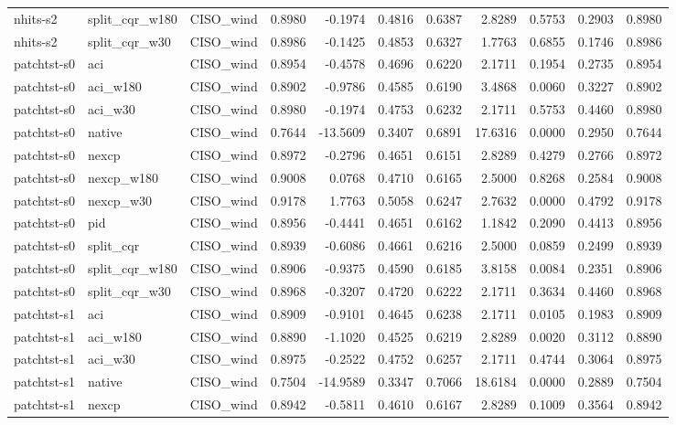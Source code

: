 \begin{tabular}{lllrrrrrrrr}
nhits-s2 & split_cqr_w180 & CISO_wind & 0.8980 & -0.1974 & 0.4816 & 0.6387 & 2.8289 & 0.5753 & 0.2903 & 0.8980 \\
nhits-s2 & split_cqr_w30 & CISO_wind & 0.8986 & -0.1425 & 0.4853 & 0.6327 & 1.7763 & 0.6855 & 0.1746 & 0.8986 \\
patchtst-s0 & aci & CISO_wind & 0.8954 & -0.4578 & 0.4696 & 0.6220 & 2.1711 & 0.1954 & 0.2735 & 0.8954 \\
patchtst-s0 & aci_w180 & CISO_wind & 0.8902 & -0.9786 & 0.4585 & 0.6190 & 3.4868 & 0.0060 & 0.3227 & 0.8902 \\
patchtst-s0 & aci_w30 & CISO_wind & 0.8980 & -0.1974 & 0.4753 & 0.6232 & 2.1711 & 0.5753 & 0.4460 & 0.8980 \\
patchtst-s0 & native & CISO_wind & 0.7644 & -13.5609 & 0.3407 & 0.6891 & 17.6316 & 0.0000 & 0.2950 & 0.7644 \\
patchtst-s0 & nexcp & CISO_wind & 0.8972 & -0.2796 & 0.4651 & 0.6151 & 2.8289 & 0.4279 & 0.2766 & 0.8972 \\
patchtst-s0 & nexcp_w180 & CISO_wind & 0.9008 & 0.0768 & 0.4710 & 0.6165 & 2.5000 & 0.8268 & 0.2584 & 0.9008 \\
patchtst-s0 & nexcp_w30 & CISO_wind & 0.9178 & 1.7763 & 0.5058 & 0.6247 & 2.7632 & 0.0000 & 0.4792 & 0.9178 \\
patchtst-s0 & pid & CISO_wind & 0.8956 & -0.4441 & 0.4651 & 0.6162 & 1.1842 & 0.2090 & 0.4413 & 0.8956 \\
patchtst-s0 & split_cqr & CISO_wind & 0.8939 & -0.6086 & 0.4661 & 0.6216 & 2.5000 & 0.0859 & 0.2499 & 0.8939 \\
patchtst-s0 & split_cqr_w180 & CISO_wind & 0.8906 & -0.9375 & 0.4590 & 0.6185 & 3.8158 & 0.0084 & 0.2351 & 0.8906 \\
patchtst-s0 & split_cqr_w30 & CISO_wind & 0.8968 & -0.3207 & 0.4720 & 0.6222 & 2.1711 & 0.3634 & 0.4460 & 0.8968 \\
patchtst-s1 & aci & CISO_wind & 0.8909 & -0.9101 & 0.4645 & 0.6238 & 2.1711 & 0.0105 & 0.1983 & 0.8909 \\
patchtst-s1 & aci_w180 & CISO_wind & 0.8890 & -1.1020 & 0.4525 & 0.6219 & 2.8289 & 0.0020 & 0.3112 & 0.8890 \\
patchtst-s1 & aci_w30 & CISO_wind & 0.8975 & -0.2522 & 0.4752 & 0.6257 & 2.1711 & 0.4744 & 0.3064 & 0.8975 \\
patchtst-s1 & native & CISO_wind & 0.7504 & -14.9589 & 0.3347 & 0.7066 & 18.6184 & 0.0000 & 0.2889 & 0.7504 \\
patchtst-s1 & nexcp & CISO_wind & 0.8942 & -0.5811 & 0.4610 & 0.6167 & 2.8289 & 0.1009 & 0.3564 & 0.8942 \\

\end{tabular}

